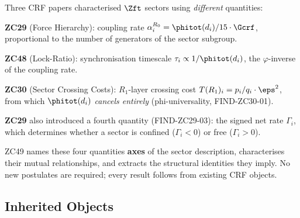 \documentclass[12pt, a4paper]{article}
\begin{document}
\begin{keybox}[title={What This Paper Unifies}]
Three CRF papers characterised $\Zft$ sectors using
\emph{different} quantities:

\medskip
\textbf{ZC29} (Force Hierarchy): coupling rate
$\alpha_i^{R_0} = \phitot(d_i)/15\cdot\Gcrf$,
proportional to the number of generators of the sector subgroup.

\medskip
\textbf{ZC48} (Lock-Ratio): synchronisation timescale
$\tau_i \propto 1/\phitot(d_i)$,
the $\varphi$-inverse of the coupling rate.

\medskip
\textbf{ZC30} (Sector Crossing Costs): $R_1$-layer crossing cost
$T(R_1)_i = p_i/q_i\cdot\eps^2$,
from which $\phitot(d_i)$ \emph{cancels entirely}
(phi-universality, FIND-ZC30-01).

\medskip
\textbf{ZC29} also introduced a fourth quantity (FIND-ZC29-03):
the signed net rate $\Gamma_i$, which determines whether a
sector is confined ($\Gamma_i < 0$) or free ($\Gamma_i > 0$).

\medskip
ZC49 names these four quantities \textbf{axes} of the sector
description, characterises their mutual relationships, and
extracts the structural identities they imply.
No new postulates are required; every result follows from
existing CRF objects.
\end{keybox}

\subsection{Inherited Objects}
\label{sec:inherited}
\end{document}
